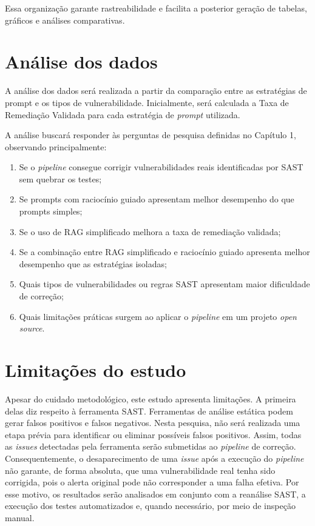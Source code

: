 Essa organização garante rastreabilidade e facilita a posterior geração de tabelas, gráficos e análises comparativas.

\section{Análise dos dados}

A análise dos dados será realizada a partir da comparação entre as estratégias de prompt e os tipos de vulnerabilidade. Inicialmente, será calculada a Taxa de Remediação Validada para cada estratégia de \textit{prompt} utilizada.

A análise buscará responder às perguntas de pesquisa definidas no Capítulo 1, observando principalmente:

\begin{enumerate}
    \item Se o \textit{pipeline} consegue corrigir vulnerabilidades reais identificadas por SAST sem quebrar os testes;
    \item Se prompts com raciocínio guiado apresentam melhor desempenho do que prompts simples;
    \item Se o uso de RAG simplificado melhora a taxa de remediação validada;
    \item Se a combinação entre RAG simplificado e raciocínio guiado apresenta melhor desempenho que as estratégias isoladas;
    \item Quais tipos de vulnerabilidades ou regras SAST apresentam maior dificuldade de correção;
    \item Quais limitações práticas surgem ao aplicar o \textit{pipeline} em um projeto \textit{open source}.
\end{enumerate}

\section{Limitações do estudo}

Apesar do cuidado metodológico, este estudo apresenta limitações. A primeira delas diz respeito à ferramenta SAST. Ferramentas de análise estática podem gerar falsos positivos e falsos negativos. Nesta pesquisa, não será realizada uma etapa prévia para identificar ou eliminar possíveis falsos positivos. Assim, todas as \textit{issues} detectadas pela ferramenta serão submetidas ao \textit{pipeline} de correção. Consequentemente, o desaparecimento de uma \textit{issue} após a execução do \textit{pipeline} não garante, de forma absoluta, que uma vulnerabilidade real tenha sido corrigida, pois o alerta original pode não corresponder a uma falha efetiva. Por esse motivo, os resultados serão analisados em conjunto com a reanálise SAST, a execução dos testes automatizados e, quando necessário, por meio de inspeção manual.

